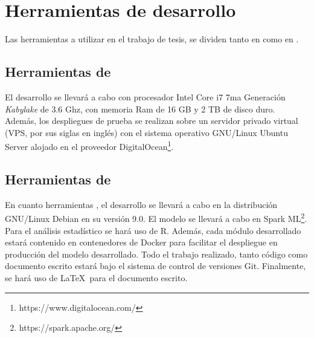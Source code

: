\section{Herramientas de desarrollo}
\label{sec:herramientas}
Las herramientas a utilizar en el trabajo de tesis, se dividen tanto en  como en .

\subsection{Herramientas de }
El desarrollo se llevará a cabo con procesador Intel Core i7 7ma Generación \textit{Kabylake} de 3.6 Ghz, con memoria Ram de 16 GB y 2 TB de disco duro. Además, los despliegues de prueba se realizan sobre un servidor privado virtual (VPS, por sus siglas en inglés) con el sistema operativo GNU/Linux Ubuntu Server alojado en el proveedor DigitalOcean\footnote{https://www.digitalocean.com/}.

\subsection{Herramientas de }
En cuanto herramientas , el desarrollo se llevará a cabo en la distribución GNU/Linux Debian en su versión 9.0. El modelo se llevará a cabo en Spark ML\footnote{https://spark.apache.org/}. Para el análisis estadístico se hará uso de R. Además, cada módulo desarrollado estará contenido en contenedores de Docker para facilitar el despliegue en producción del modelo desarrollado. Todo el trabajo realizado, tanto código como documento escrito estará bajo el sistema de control de versiones Git. Finalmente, se hará uso de \LaTeX\ para el documento escrito.